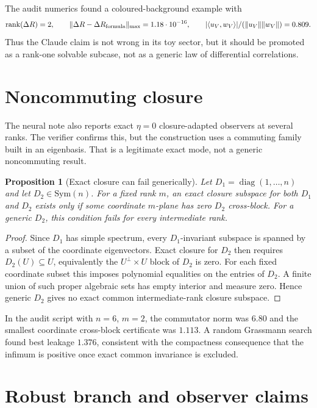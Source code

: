 \documentclass[11pt,a4paper]{article}
\numberwithin{equation}{section}
\DeclareMathOperator{\rank}{rank}
\DeclareMathOperator{\diag}{diag}
\theoremstyle{thmcompact}
\newtheorem{proposition}[theorem]{Proposition}
\theoremstyle{remark}
\begin{document}
The audit numerics found a coloured-background example with
\[
  \rank(\Delta R)=2,\qquad
  \|\Delta R-\Delta R_{\rm formula}\|_{\max}=1.18\cdot10^{-16},
  \qquad
  |\langle u_V,w_V\rangle|/(\|u_V\|\|w_V\|)=0.809.
\]
Thus the Claude claim is not wrong in its toy sector, but it should be promoted
as a rank-one solvable subcase, not as a generic law of differential
correlations.

\section{Noncommuting closure}

The neural note also reports exact \(\eta=0\) closure-adapted observers at
several ranks. The verifier confirms this, but the construction uses a
commuting family built in an eigenbasis. That is a legitimate exact mode, not a
generic noncommuting result.

\begin{proposition}[Exact closure can fail generically]
Let \(D_1=\diag(1,\ldots,n)\) and let \(D_2\in\mathrm{Sym}(n)\). For a fixed
rank \(m\), an exact closure subspace for both \(D_1\) and \(D_2\) exists only
if some coordinate \(m\)-plane has zero \(D_2\) cross-block. For a generic
\(D_2\), this condition fails for every intermediate rank.
\end{proposition}

\begin{proof}
Since \(D_1\) has simple spectrum, every \(D_1\)-invariant subspace is spanned
by a subset of the coordinate eigenvectors. Exact closure for \(D_2\) then
requires \(D_2(U)\subseteq U\), equivalently the \(U^\perp\times U\) block of
\(D_2\) is zero. For each fixed coordinate subset this imposes polynomial
equalities on the entries of \(D_2\). A finite union of such proper algebraic
sets has empty interior and measure zero. Hence generic \(D_2\) gives no exact
common intermediate-rank closure subspace.
\end{proof}

In the audit script with \(n=6\), \(m=2\), the commutator norm was \(6.80\) and
the smallest coordinate cross-block certificate was \(1.113\). A random
Grassmann search found best leakage \(1.376\), consistent with the compactness
consequence that the infimum is positive once exact common invariance is
excluded.

\section{Robust branch and observer claims}
\end{document}
